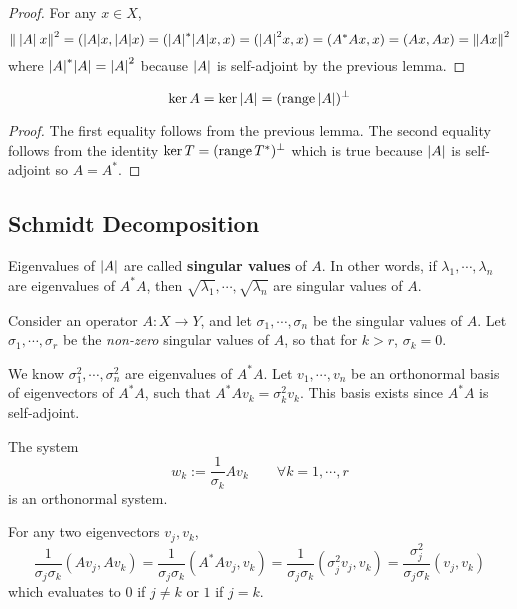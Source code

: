 \begin{proof}
For any $x \in X$, 
$$\norm{\: \abs{A} \: x}^{2} = (\abs{A} x, \abs{A} x) = (\abs{A}^{*} \abs{A} x, x) = (\abs{A}^{2} x, x) = (A^{*} A x, x) = (Ax, Ax) = \norm{Ax}^{2}$$
where $\abs{A}^{*} \abs{A} = \abs{A}^{2}$ because $\abs{A}$ is self-adjoint by the previous lemma. 
\end{proof}

\begin{theorem}
$$\operatorname{ker} A = \operatorname{ker} \abs{A} = (\operatorname{range} \abs{A})^{\perp}$$
\end{theorem}

\begin{proof}
The first equality follows from the previous lemma. The second equality follows from the identity $\operatorname{ker} T = (\operatorname{range} T^{*})^{\perp}$ which is true because $\abs{A}$ is self-adjoint so $A = A^{*}$. 
\end{proof}

\subsection{Schmidt Decomposition}

\begin{definition}
Eigenvalues of $\abs{A}$ are called \textbf{singular values} of $A$. In other words, if $\lambda_{1}, \cdots, \lambda_{n}$ are eigenvalues of $A^{*}A$, then $\sqrt{\lambda_{1}}, \cdots, \sqrt{\lambda_{n}}$ are singular values of $A$. 
\end{definition}

Consider an operator $A : X \rightarrow Y$, and let $\sigma_{1}, \cdots, \sigma_{n}$ be the singular values of $A$. Let $\sigma_{1}, \cdots, \sigma_{r}$ be the \textit{non-zero} singular values of $A$, so that for $k > r$, $\sigma_{k} = 0$.

We know $\sigma_{1}^{2}, \cdots, \sigma_{n}^{2}$ are eigenvalues of $A^{*}A$. Let $v_{1}, \cdots, v_{n}$ be an orthonormal basis of eigenvectors of $A^{*}A$, such that $A^{*}Av_{k} = \sigma_{k}^{2} v_{k}$. This basis exists since $A^{*}A$ is self-adjoint. 

\begin{lemma}
The system 
$$w_{k} := \frac{1}{\sigma_{k}} Av_{k} \qquad \forall k = 1, \cdots, r$$
is an orthonormal system. 
\end{lemma}

\begin{lproof}
For any two eigenvectors $v_{j}, v_{k}$, 
$$\frac{1}{\sigma_{j} \sigma_{k}} (Av_{j}, Av_{k}) = \frac{1}{\sigma_{j} \sigma_{k}} (A^{*} Av_{j}, v_{k}) = \frac{1}{\sigma_{j} \sigma_{k}} (\sigma_{j}^{2} v_{j}, v_{k}) = \frac{\sigma_{j}^{2}}{\sigma_{j} \sigma_{k}} (v_{j}, v_{k})$$
which evaluates to 0 if $j \neq k$ or $1$ if $j = k$. 
\end{lproof}

